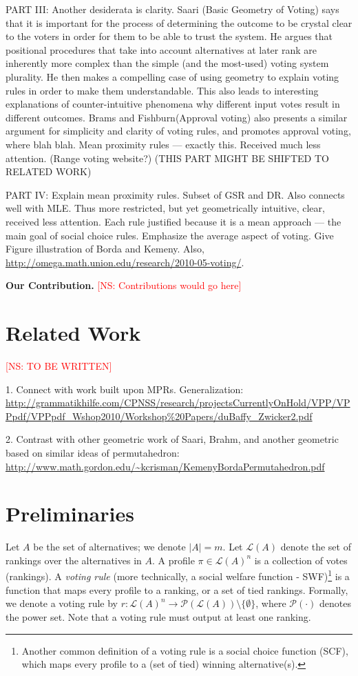 \documentclass[prodmode,acmec]{ec-acmsmall}
\newcommand{\calL}{{\mathcal{L}}}
\newcommand{\rank}{{\calL(A)}}
\newcommand{\calP}{{\mathcal{P}}}
\newcommand{\kibitz}[2]{\ifnum\Comments=1\textcolor{#1}{#2}\fi}
\newcommand{\ns}[1]{\kibitz{red} {[NS: #1]}}
\begin{document}
PART III: Another desiderata is clarity. Saari (Basic Geometry of Voting) says that it is important for the process of determining the outcome to be crystal clear to the voters in order for them to be able to trust the system. He argues that positional procedures that take into account alternatives at later rank are inherently more complex than the simple (and the most-used) voting system plurality. He then makes a compelling case of using geometry to explain voting rules in order to make them understandable. This also leads to interesting explanations of counter-intuitive phenomena why different input votes result in different outcomes. Brams and Fishburn(Approval voting) also presents a similar argument for simplicity and clarity of voting rules, and promotes approval voting, where blah blah. Mean proximity rules --- exactly this. Received much less attention. (Range voting website?) (THIS PART MIGHT BE SHIFTED TO RELATED WORK)

PART IV: Explain mean proximity rules. Subset of GSR and DR. Also connects well with MLE. Thus more restricted, but yet geometrically intuitive, clear, received less attention. Each rule justified because it is a mean approach --- the main goal of social choice rules. Emphasize the average aspect of voting. Give Figure illustration of Borda and Kemeny. Also, \url{http://omega.math.union.edu/research/2010-05-voting/}. 

\noindent \textbf{Our Contribution.} \ns{Contributions would go here}

\section{Related Work}
\ns{TO BE WRITTEN}

1. Connect with work built upon MPRs. Generalization: \url{http://grammatikhilfe.com/CPNSS/research/projectsCurrentlyOnHold/VPP/VPPpdf/VPPpdf_Wshop2010/Workshop%20Papers/duBaffy_Zwicker2.pdf}


2. Contrast with other geometric work of Saari, Brahm, and another geometric based on similar ideas of permutahedron: \url{http://www.math.gordon.edu/~kcrisman/KemenyBordaPermutahedron.pdf}



\section{Preliminaries}
\label{sec:prelim}
Let $A$ be the set of alternatives; we denote $|A| = m$. Let $\rank$ denote the set of rankings over the alternatives in $A$. A profile $\pi \in \rank^n$ is a collection of votes (rankings). A \emph{voting rule} (more technically, a social welfare function - SWF)\footnote{Another common definition of a voting rule is a social choice function (SCF), which maps every profile to a (set of tied) winning alternative(s).} is a function that maps every profile to a ranking, or a set of tied rankings. Formally, we denote a voting rule by $r : \rank^n \rightarrow \calP(\rank)\setminus\{\emptyset\}$, where $\calP(\cdot)$ denotes the power set. Note that a voting rule must output at least one ranking. \\
\end{document}
